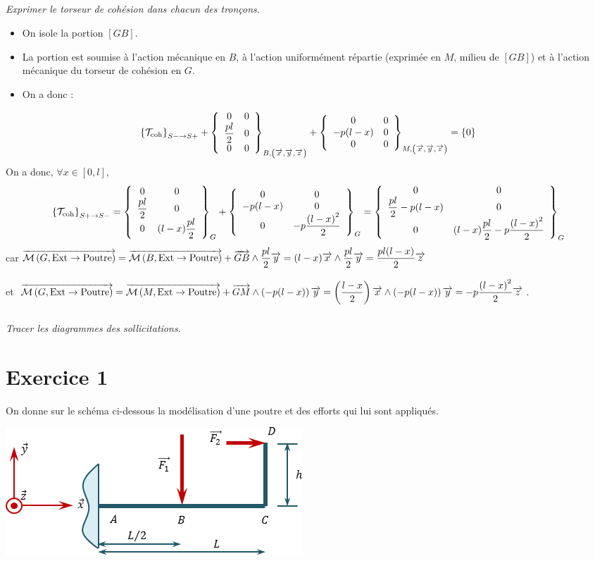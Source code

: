 \documentclass[10pt,fleqn]{article} %
\begin{document}
\begin{multicols}{2}

\subparagraph{}
\textit{Exprimer le torseur de cohésion dans chacun des tronçons.}
\ifprof
\begin{corrige}
\begin{itemize}
\item On isole la portion $[GB]$.
\item La portion est soumise à l'action mécanique en $B$, à l'action uniformément répartie (exprimée en $M$, milieu de $[GB]$) et à l'action mécanique du torseur de cohésion en $G$.
\item On a donc : 
\end{itemize}
$$
\torseurscoh_{S-\rightarrow S+} +
 \torseurcol{0}{\dfrac{pl}{2}}{0}{0}{0}{0}{B,\left( \vect{x},\vect{y},\vect{z} \right)} 
 +\torseurcol{0}{-p(l-x)}{0}{0}{0}{0}{M,\left( \vect{x},\vect{y},\vect{z} \right)} 
 = \{0\}
$$
On a donc, $\forall x \in \left[0,l\right]$, 
$$
\torseurscoh_{S+\rightarrow S-}
= \torseurcol{0}{\dfrac{pl}{2}}{0}{0}{0}{(l-x)\dfrac{pl}{2}}{G} 
 +\torseurcol{0}{-p(l-x)}{0}{0}{0}{-p\dfrac{\left(l-x\right)^2}{2}}{G} 
 = \torseurcol{0}{\dfrac{pl}{2}-p(l-x)}{0}{0}{0}{(l-x)\dfrac{pl}{2}-p\dfrac{\left(l-x\right)^2}{2}}{G} 
$$
car 
$\vectm{G}{\text{Ext}}{\text{Poutre}}
=\vectm{B}{\text{Ext}}{\text{Poutre}} + \vect{GB}\wedge \dfrac{pl}{2} \vect{y}  
=  (l-x)\vect{x}  \wedge \dfrac{pl}{2} \vect{y}
=  \dfrac{pl(l-x)}{2} \vect{z}
$ 

et 
$\vectm{G}{\text{Ext}}{\text{Poutre}}
=  \vectm{M}{\text{Ext}}{\text{Poutre}} + \vect{GM}\wedge \left( -p(l-x) \right) \vect{y}  
= \left(\dfrac{l-x}{2}\right)\vect{x}\wedge \left(-p(l-x)\right) \vect{y}  
=  -p\dfrac{\left(l-x\right)^2}{2}\vect{z}  
$.
\end{corrige}
\else 
\fi

\subparagraph{}
\textit{Tracer les diagrammes des sollicitations.}
\ifprof
\begin{corrige}
\end{corrige}

\else 
\fi







\section*{Exercice 1}
\setcounter{subparagraph}{0}
On donne sur le schéma ci-dessous la modélisation d'une poutre et des efforts qui lui sont appliqués.
\begin{center}
\includegraphics[width=.45\textwidth]{images/exo_08}
\end{center}


\end{multicols}
\end{document}

